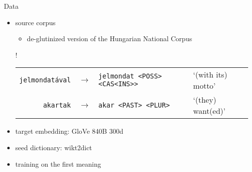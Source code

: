 \documentclass[10pt]{beamer}%
\newcommand{\bull}[1]{\begin{itemize}\item #1 \end{itemize}}
\begin{document}
\begin{frame}{Data}
  \begin{itemize}
    \item source corpus
      \bull{
      de-glutinized version \citep{Borbely:2016d,Nemeskey:2017} of the
      Hungarian National Corpus \citep{Oravecz:2014}}
    \begin{center}
        \resizebox{\textwidth} {!} {%
      \begin{tabular}{rcll}
         \texttt{jelmondatával} & $\rightarrow$ & \texttt{jelmondat <POSS> <CAS<INS>>} & `(with its) motto'\\
    \texttt{akartak} & $\rightarrow$ & \texttt{akar <PAST> <PLUR>} & `(they)
      want(ed)'\\
      \end{tabular}
      }
    \end{center}
    \item target embedding: GloVe 840B 300d \citep{Pennington:2014}
    \item seed dictionary: wikt2dict \citep{Acs:2013}
    \item training on the first meaning
  \end{itemize}
\end{frame}
\end{document}
